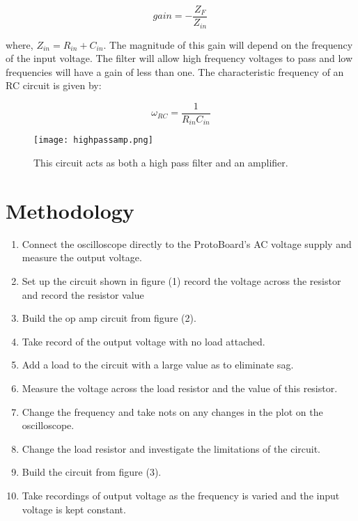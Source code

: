 \documentclass[twocolumn, amsmath]{revtex4}
\begin{document}
\begin{equation}
gain =  -\frac{Z_{F}}{Z_{in}} \,
\end{equation}

where, $Z_{in} = R_{in} + C_{in}$. The magnitude of this gain will depend on the frequency of the input voltage. The filter will allow high frequency voltages to pass and low frequencies will have a gain of less than one. The characteristic frequency of an RC circuit is given by:

\begin{equation}
\omega_{RC} =  \frac{1}{R_{in}C_{in}}
\end{equation}


\begin{figure}[h]
    \texttt{[image: highpassamp.png]}  
    \caption{This circuit acts as both a high pass filter and an amplifier.}
\end{figure}


\section{Methodology}

\begin{enumerate}
    \item Connect the oscilloscope directly to the ProtoBoard's AC voltage supply and measure the output voltage.
    \item Set up the circuit shown in figure (1) record the voltage across the resistor and record the resistor value
    \item Build the op amp circuit from figure (2).
    \item Take record of the output voltage with no load attached.
    \item Add a load to the circuit with a large value as to eliminate sag.
    \item Measure the voltage across the load resistor and the value of this resistor.
    \item Change the frequency and take nots on any changes in the plot on the oscilloscope.
    \item Change the load resistor and investigate the limitations of the circuit.
    \item Build the circuit from figure (3).
    \item Take recordings of output voltage as the frequency is varied and the input voltage is kept constant.
\end{enumerate}
\end{document}
